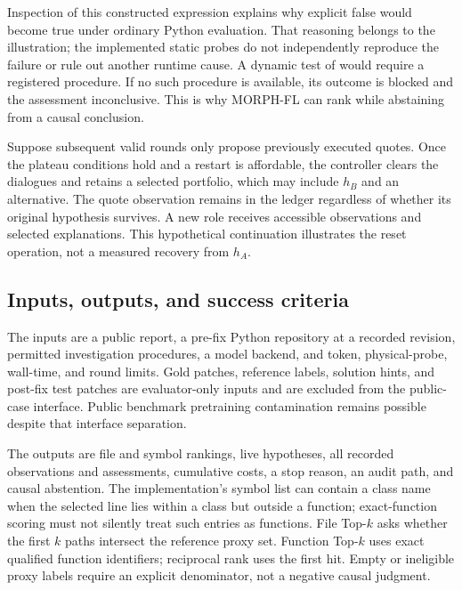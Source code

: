 \documentclass[letterpaper,journal]{IEEEtran}
\newcommand{\tool}{MORPH-FL}
\newcommand{\code}[1]{\texttt{\detokenize{#1}}}
\begin{document}
Inspection of this constructed expression explains why explicit false would become true under ordinary Python evaluation. That reasoning belongs to the illustration; the implemented static probes do not independently reproduce the failure or rule out another runtime cause. A dynamic test of \code{normalize} would require a registered procedure. If no such procedure is available, its outcome is blocked and the assessment inconclusive. This is why \tool{} can rank \code{config.py} while abstaining from a causal conclusion.

Suppose subsequent valid rounds only propose previously executed quotes. Once the plateau conditions hold and a restart is affordable, the controller clears the dialogues and retains a selected portfolio, which may include $h_B$ and an alternative. The quote observation remains in the ledger regardless of whether its original hypothesis survives. A new role receives accessible observations and selected explanations. This hypothetical continuation illustrates the reset operation, not a measured recovery from $h_A$.

\subsection{Inputs, outputs, and success criteria}\label{sec:problem}
The inputs are a public report, a pre-fix Python repository at a recorded revision, permitted investigation procedures, a model backend, and token, physical-probe, wall-time, and round limits. Gold patches, reference labels, solution hints, and post-fix test patches are evaluator-only inputs and are excluded from the public-case interface. Public benchmark pretraining contamination remains possible despite that interface separation.

The outputs are file and symbol rankings, live hypotheses, all recorded observations and assessments, cumulative costs, a stop reason, an audit path, and causal abstention. The implementation's symbol list can contain a class name when the selected line lies within a class but outside a function; exact-function scoring must not silently treat such entries as functions. File Top-$k$ asks whether the first $k$ paths intersect the reference proxy set. Function Top-$k$ uses exact qualified function identifiers; reciprocal rank uses the first hit. Empty or ineligible proxy labels require an explicit denominator, not a negative causal judgment.
\end{document}
